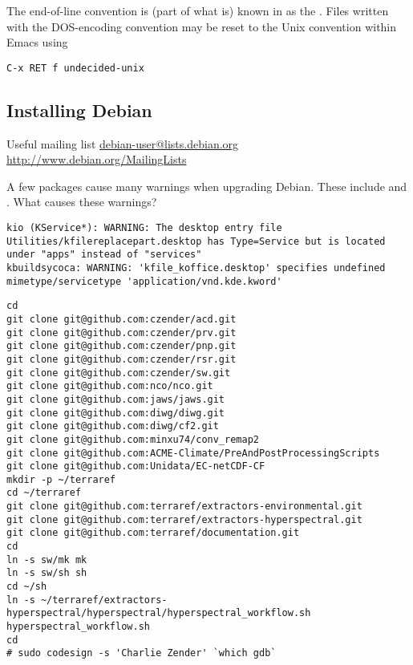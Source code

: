 \documentclass[12pt,twoside]{article}
\begin{document}
The end-of-line convention is (part of what is) known in
 as the .
Files written with the DOS-encoding convention may be reset to the
Unix convention within Emacs using
\begin{verbatim}
C-x RET f undecided-unix
\end{verbatim}

\subsection{Installing Debian}\label{sxn:dbn_nst}
Useful mailing list \url{debian-user@lists.debian.org}
\url{http://www.debian.org/MailingLists}

A few packages cause many warnings when upgrading Debian. 
These include  and .
What causes these warnings?
\begin{verbatim}
kio (KService*): WARNING: The desktop entry file Utilities/kfilereplacepart.desktop has Type=Service but is located under "apps" instead of "services"
kbuildsycoca: WARNING: 'kfile_koffice.desktop' specifies undefined mimetype/servicetype 'application/vnd.kde.kword'
\end{verbatim}

\begin{verbatim}
cd
git clone git@github.com:czender/acd.git
git clone git@github.com:czender/prv.git
git clone git@github.com:czender/pnp.git
git clone git@github.com:czender/rsr.git
git clone git@github.com:czender/sw.git
git clone git@github.com:nco/nco.git
git clone git@github.com:jaws/jaws.git
git clone git@github.com:diwg/diwg.git
git clone git@github.com:diwg/cf2.git
git clone git@github.com:minxu74/conv_remap2
git clone git@github.com:ACME-Climate/PreAndPostProcessingScripts
git clone git@github.com:Unidata/EC-netCDF-CF
mkdir -p ~/terraref
cd ~/terraref
git clone git@github.com:terraref/extractors-environmental.git
git clone git@github.com:terraref/extractors-hyperspectral.git
git clone git@github.com:terraref/documentation.git
cd
ln -s sw/mk mk
ln -s sw/sh sh
cd ~/sh
ln -s ~/terraref/extractors-hyperspectral/hyperspectral/hyperspectral_workflow.sh hyperspectral_workflow.sh
cd
# sudo codesign -s 'Charlie Zender' `which gdb`
\end{verbatim}
\end{document}
